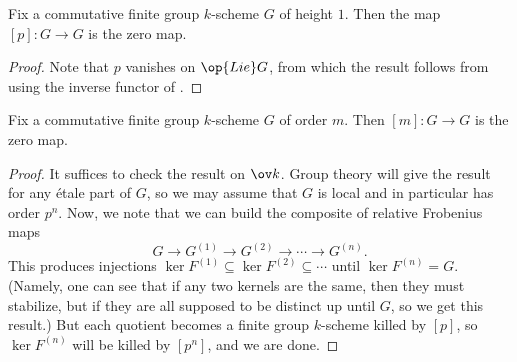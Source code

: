 \documentclass[../notes.tex]{subfiles}
\begin{document}
\begin{corollary}
	Fix a commutative finite group $k$-scheme $G$ of height $1$. Then the map $[p]\colon G\to G$ is the zero map.
\end{corollary}
\begin{proof}
	Note that $p$ vanishes on $\op{Lie}G$, from which the result follows from using the inverse functor of .
\end{proof}
\begin{corollary}
	Fix a commutative finite group $k$-scheme $G$ of order $m$. Then $[m]\colon G\to G$ is the zero map.
\end{corollary}
\begin{proof}
	It suffices to check the result on $\ov k$. Group theory will give the result for any \'etale part of $G$, so we may assume that $G$ is local and in particular has order $p^n$. Now, we note that we can build the composite of relative Frobenius maps
	\[G\to G^{(1)}\to G^{(2)}\to\cdots\to G^{(n)}.\]
	This produces injections $\ker F^{(1)}\subseteq\ker F^{(2)}\subseteq\cdots$ until $\ker F^{(n)}=G$. (Namely, one can see that if any two kernels are the same, then they must stabilize, but if they are all supposed to be distinct up until $G$, so we get this result.) But each quotient becomes a finite group $k$-scheme killed by $[p]$, so $\ker F^{(n)}$ will be killed by $[p^n]$, and we are done.
\end{proof}
\end{document}
